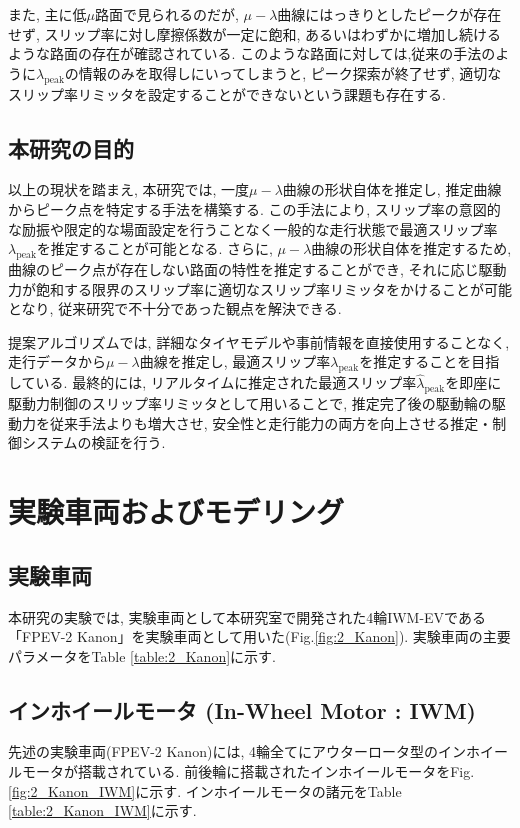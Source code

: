 \documentclass[11pt,a4paper,oneside,onecolumn,fleqn,dvipdfmx]{jsarticle}
\begin{document}
また, 主に低$\mu$路面で見られるのだが, $\mu-\lambda$曲線にはっきりとしたピークが存在せず, スリップ率に対し摩擦係数が一定に飽和, あるいはわずかに増加し続けるような路面の存在が確認されている. 
このような路面に対しては,従来の手法のように$\lambda_\mathrm{peak}$の情報のみを取得しにいってしまうと, ピーク探索が終了せず, 適切なスリップ率リミッタを設定することができないという課題も存在する.

\subsection{本研究の目的}
以上の現状を踏まえ, 本研究では, 一度$\mu-\lambda$曲線の形状自体を推定し, 推定曲線からピーク点を特定する手法を構築する.
この手法により, スリップ率の意図的な励振や限定的な場面設定を行うことなく一般的な走行状態で最適スリップ率$\lambda_\mathrm{peak}$を推定することが可能となる.
さらに, $\mu-\lambda$曲線の形状自体を推定するため, 曲線のピーク点が存在しない路面の特性を推定することができ, それに応じ駆動力が飽和する限界のスリップ率に適切なスリップ率リミッタをかけることが可能となり, 
従来研究で不十分であった観点を解決できる.

提案アルゴリズムでは, 詳細なタイヤモデルや事前情報を直接使用することなく,
走行データから$\mu-\lambda$曲線を推定し,
最適スリップ率$\lambda_{\mathrm{peak}}$を推定することを目指している.
最終的には, リアルタイムに推定された最適スリップ率$\hat{\lambda}_\mathrm{peak}$を即座に駆動力制御のスリップ率リミッタとして用いることで, 推定完了後の駆動輪の駆動力を従来手法よりも増大させ, 安全性と走行能力の両方を向上させる推定・制御システムの検証を行う.




\clearpage
\section{実験車両およびモデリング}
\subsection{実験車両}
本研究の実験では, 実験車両として本研究室で開発された4輪IWM-EVである「FPEV-2 Kanon」を実験車両として用いた(Fig.\ref{fig:2_Kanon}). 
実験車両の主要パラメータをTable \ref{table:2_Kanon}に示す. 

\subsection{インホイールモータ (In-Wheel Motor : IWM)}
先述の実験車両(FPEV-2 Kanon)には, 4輪全てにアウターロータ型のインホイールモータが搭載されている. 前後輪に搭載されたインホイールモータをFig.\ref{fig:2_Kanon_IWM}に示す.
インホイールモータの諸元をTable \ref{table:2_Kanon_IWM}に示す. 
\end{document}
